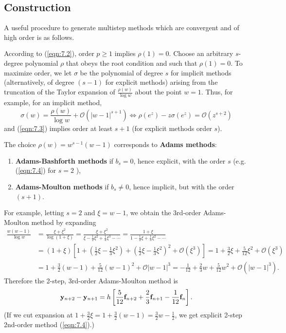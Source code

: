 \documentclass[a4paper]{article}
\begin{document}
\subsection{Construction}
A useful procedure to generate multistep methods which are convergent and of high order is as follows.
\begin{technique}
    According to (\ref{eqn:7.2}), order $p \geq 1$ implies $\rho(1)=0$. Choose an arbitrary $s$-degree polynomial $\rho$ that obeys the root condition and such that $\rho(1)=0$. To maximize order, we let $\sigma$ be the polynomial of degree $s$ for implicit methods (alternatively, of degree $(s-1)$ for explicit methods) arising from the truncation of the Taylor expansion of $\frac{\rho(w)}{\log w}$ about the point $w=1$. Thus, for example, for an implicit method,
    \[
    \sigma(w)=\frac{\rho(w)}{\log w}+\mathcal{O}\left(|w-1|^{s+1}\right) \Leftrightarrow \rho\left(e^z\right)-z \sigma\left(e^z\right)=\mathcal{O}\left(z^{s+2}\right)
    \]
    and (\ref{eqn:7.3}) implies order at least $s+1$ (for explicit methods order $s$).
\end{technique}
\begin{example}
    The choice $\rho(w)=w^{s-1}(w-1)$ corresponds to \textbf{Adams methods}:
\begin{enumerate}[(1)]
    \item \textbf{Adams-Bashforth methods} if $b_s=0$, hence explicit, with the order $s$ (e.g. (\ref{eqn:7.4}) for $s=2$ ),
    \item \textbf{Adams-Moulton methods} if $b_s \neq 0$, hence implicit, but with the order $(s+1)$.
\end{enumerate}
For example, letting $s=2$ and $\xi=w-1$, we obtain the 3rd-order Adams-Moulton method by expanding
\[
\begin{aligned}
\frac{w(w-1)}{\log w} & =\frac{\xi+\xi^2}{\log (1+\xi)}=\frac{\xi+\xi^2}{\xi-\frac{1}{2} \xi^2+\frac{1}{3} \xi^3-\cdots}=\frac{1+\xi}{1-\frac{1}{2} \xi+\frac{1}{3} \xi^2-\cdots} \\
& =(1+\xi)\left[1+\left(\frac{1}{2} \xi-\frac{1}{3} \xi^2\right)+\left(\frac{1}{2} \xi-\frac{1}{3} \xi^2\right)^2+\mathcal{O}\left(\xi^3\right)\right]=1+\frac{3}{2} \xi+\frac{5}{12} \xi^2+\mathcal{O}\left(\xi^3\right) \\
& =1+\frac{3}{2}(w-1)+\frac{5}{12}(w-1)^2+\mathcal{O}|w-1|^3=-\frac{1}{12}+\frac{2}{3} w+\frac{5}{12} w^2+\mathcal{O}\left(|w-1|^3\right) .
\end{aligned}
\]
Therefore the 2-step, 3rd-order Adams-Moulton method is
\[
\mathbf{y}_{n+2}-\mathbf{y}_{n+1}=h\left[\frac{5}{12} \mathbf{f}_{n+2}+\frac{2}{3} \mathbf{f}_{n+1}-\frac{1}{12} {\bf f}_n\right] .
\]
(If we cut expansion at $1+\frac{3}{2} \xi=1+\frac{3}{2}(w-1)=\frac{3}{2} w-\frac{1}{2}$, we get explicit 2-step 2nd-order method (\ref{eqn:7.4}).)
\end{example}
\end{document}
